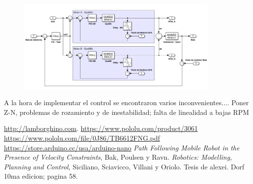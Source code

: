 \documentclass[10pt,conference,a4paper,onecolumn]{article}%
\begin{document}
\begin{figure}[h]
\centering
\includegraphics[width=10cm]{./imagenes/sistema_total}
\caption{}
\end{figure}


A la hora de implementar el control se encontraron varios inconvenientes.... Poner Z-N, problemas de rozamiento y de inestabilidad; falta de linealidad a bajas RPM


\begin{thebibliography}{X}
 \url{http://lamborghino.com}. 
\url{https://www.pololu.com/product/3061}
\url{ https://www.pololu.com/file/0J86/TB6612FNG.pdf}
 \url{https://store.arduino.cc/usa/arduino-nano}
 \textit{Path Following Mobile Robot in the Presence of Velocity Constraints}, Bak, Poulsen y Ravn.
 \textit{Robotics: Modelling, Planning and Control}, Siciliano, Sciavicco, Villani y Oriolo.
 Tesis de alexei.
 Dorf 10ma edicion; pagina 58.
\end{thebibliography}
\end{document}
